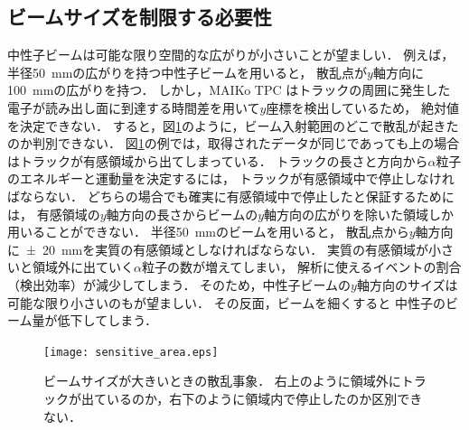 \documentclass[../master]{subfiles}
\begin{document}
\subsection{ビームサイズを制限する必要性}
中性子ビームは可能な限り空間的な広がりが小さいことが望ましい．
例えば，半径\SI{50}{\milli\metre}の広がりを持つ中性子ビームを用いると，
散乱点が$y$軸方向に\SI{100}{\milli\metre}の広がりを持つ．
しかし，MAIKo TPC はトラックの周囲に発生した電子が読み出し面に到達する時間差を用いて$y$座標を検出しているため，
絶対値を決定できない．
すると，図\ref{fig::sensitive_area}のように，ビーム入射範囲のどこで散乱が起きたのか判別できない．
図\ref{fig::sensitive_area}の例では，取得されたデータが同じであっても上の場合はトラックが有感領域から出てしまっている．
トラックの長さと方向から$\alpha$粒子のエネルギーと運動量を決定するには，
トラックが有感領域中で停止しなければならない．
どちらの場合でも確実に有感領域中で停止したと保証するためには，
有感領域の$y$軸方向の長さからビームの$y$軸方向の広がりを除いた領域しか用いることができない．
半径\SI{50}{\milli\metre}のビームを用いると，
散乱点から$y$軸方向に\SI{\pm20}{\milli\metre}を実質の有感領域としなければならない．
実質の有感領域が小さいと領域外に出ていく$\alpha$粒子の数が増えてしまい，
解析に使えるイベントの割合（検出効率）が減少してしまう．
そのため，中性子ビームの$y$軸方向のサイズは可能な限り小さいのもが望ましい．
その反面，ビームを細くすると
中性子のビーム量が低下してしまう．
\begin{figure}
  \centering
  \texttt{[image: sensitive\_area.eps]}
  \caption[ビームサイズが大きいときの散乱事象．]
          {ビームサイズが大きいときの散乱事象．
            右上のように領域外にトラックが出ているのか，右下のように領域内で停止したのか区別できない．}
  \label{fig::sensitive_area}
\end{figure}
\end{document}

